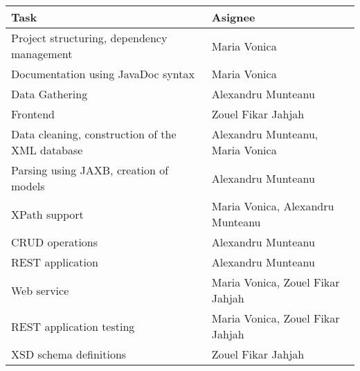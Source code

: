 \begin{center}
  \begin{tabular}{ll}
    Task & Asignee \\
    \hline
    Project structuring, dependency management & Maria Vonica \\
    Documentation using JavaDoc syntax & Maria Vonica \\
    Data Gathering & Alexandru Munteanu \\
    Frontend & Zouel Fikar Jahjah \\
    Data cleaning, construction of the XML database & Alexandru Munteanu, Maria Vonica \\
    Parsing using JAXB, creation of models & Alexandru Munteanu \\
    XPath support & Maria Vonica, Alexandru Munteanu \\
    CRUD operations & Alexandru Munteanu \\
    REST application & Alexandru Munteanu \\
    Web service & Maria Vonica, Zouel Fikar Jahjah \\
    REST application testing & Maria Vonica, Zouel Fikar Jahjah \\
    XSD schema definitions & Zouel Fikar Jahjah \\
    \end{tabular}
  \end{center}
